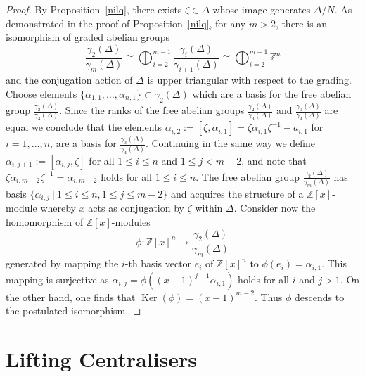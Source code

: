 \documentclass{amsart}
\numberwithin{theorem}{section}
\numberwithin{equation}{section}
\newcommand{\Z}{\mathbb{Z}}
\begin{document}
\begin{proof}
    By Proposition~\ref{nilq}, there exists $\zeta \in \Delta$ whose image generates $\Delta/N$. As demonstrated in the proof of Proposition~\ref{nilq}, for any $m >2$, there is an isomorphism of graded abelian groups
    \[
    \frac{\gamma_2(\Delta)}{\gamma_m(\Delta)} \cong \bigoplus_{i=2}^{m-1} \frac{\gamma_{i}(\Delta)}{\gamma_{i+1}(\Delta)} \cong \bigoplus_{i=2}^{m-1} \Z^n
    \]
    and the conjugation action of $\Delta$ is upper triangular with respect to the grading. Choose elements $\{\alpha_{1,1}, \ldots, \alpha_{n,1}\} \subset \gamma_2(\Delta)$ which are a basis for the free abelian group $\frac{\gamma_2(\Delta)}{\gamma_3(\Delta)}$. Since the ranks of the free abelian groups $\frac{\gamma_2(\Delta)}{\gamma_3(\Delta)}$ and $\frac{\gamma_3(\Delta)}{\gamma_4(\Delta)}$ are equal we conclude that the elements $\alpha_{i,2}:= [\zeta, \alpha_{i,1}]= \zeta \alpha_{i,1} \zeta^{-1} -a_{i,1}$ for $i=1, \ldots, n$, are a basis for $\frac{\gamma_3(\Delta)}{\gamma_4(\Delta)}$. Continuing in the same way we define  $\alpha_{i,j+1}:=[\alpha_{i,j}, \zeta]$  for all $1 \leq i \leq n$ and $1 \leq j< m-2$, and note that $\zeta \alpha_{i,m-2} \zeta^{-1} = \alpha_{i,m-2}$ holds for all $1 \leq i \leq n$. The free abelian group $\frac{\gamma_2(\Delta)}{\gamma_m(\Delta)}$ has basis $\{\alpha_{i,j} \ | \ 1 \leq i \leq n, 1 \leq j \leq m-2 \}$ and acquires the structure of a $\Z[x]$-module whereby $x$ acts as conjugation by $\zeta$ within $\Delta$. Consider now the homomorphism of $\Z[x]$-modules \[
    \phi \colon \Z[x]^n \to \frac{\gamma_2(\Delta)}{\gamma_m(\Delta)}
    \]
    generated by mapping the $i$-th basis vector $e_i$ of $\Z[x]^n$ to $\phi(e_i) = \alpha_{i,1}$. This mapping is surjective as $\alpha_{i,j} = \phi\left((x-1)^{j-1} \alpha_{i,1}\right)$ holds for all $i$ and $j > 1$. On the other hand, one finds that $\operatorname{Ker}(\phi) = (x-1)^{m-2}$. Thus $\phi$ descends to the postulated isomorphism. 
\end{proof}

\section{Lifting Centralisers}\label{Sec::Lifting}
\end{document}
